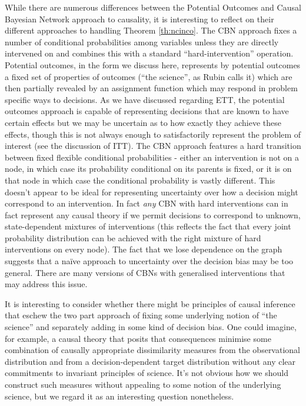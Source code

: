 While there are numerous differences between the Potential Outcomes and Causal Bayesian Network approach to causality, it is interesting to reflect on their different approaches to handling Theorem \ref{th:ncinco}. The CBN approach fixes a number of conditional probabilities among variables unless they are directly intervened on and combines this with a standard ``hard-intervention'' operation. Potential outcomes, in the form we discuss here, represents by potential outcomes a fixed set of properties of outcomes (``the science'', as Rubin calls it) which are then partially revealed by an assignment function which may respond in problem specific ways to decisions. As we have discussed regarding ETT, the potential outcomes approach is capable of representing decisions that are known to have certain effects but we may be uncertain as to how exactly they achieve these effects, though this is not always enough to satisfactorily represent the problem of interest (see the discussion of ITT). The CBN approach features a hard transition between fixed flexible conditional probabilities - either an intervention is not on a node, in which case its probability conditional on its parents is fixed, or it is on that node in which case the conditional probability is vastly different. This doesn't appear to be ideal for representing uncertainty over how a decision might correspond to an intervention. In fact \emph{any} CBN with hard interventions can in fact represent any causal theory if we permit decisions to correspond to unknown, state-dependent mixtures of interventions (this reflects the fact that every joint probability distribution can be achieved with the right mixture of hard interventions on every node). The fact that we lose dependence on the graph suggests that a na\"ive approach to uncertainty over the decision bias may be too general. There are many versions of CBNs with generalised interventions that may address this issue.

It is interesting to consider whether there might be principles of causal inference that eschew the two part approach of fixing some underlying notion of ``the science'' and separately adding in some kind of decision bias. One could imagine, for example, a causal theory that posits that consequences minimise some combination of causally appropriate dissimilarity measures from the observational distribution and from a decision-dependent target distribution without any clear commitments to invariant principles of science. It's not obvious how we should construct such measures without appealing to some notion of the underlying science, but we regard it as an interesting question nonetheless.